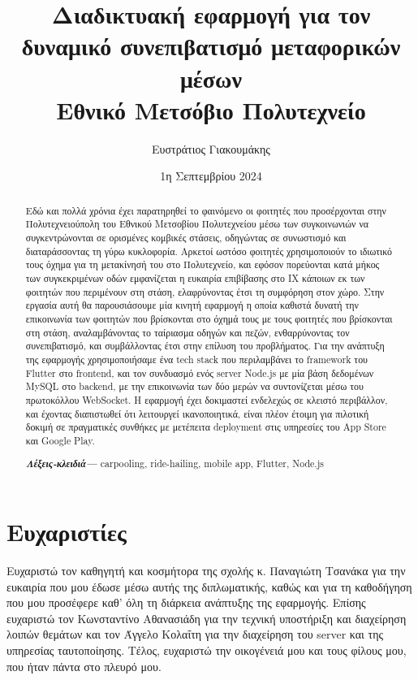 \documentclass[a4paper, 11pt]{report}
\title{
    {Διαδικτυακή εφαρμογή για τον δυναμικό συνεπιβατισμό μεταφορικών μέσων}\\
    {\large Εθνικό Μετσόβιο Πολυτεχνείο}
}
\author{Ευστράτιος Γιακουμάκης}
\date{1η Σεπτεμβρίου 2024}
\begin{document}
\begin{abstract}\thispagestyle{plain}
    Εδώ και πολλά χρόνια έχει παρατηρηθεί το φαινόμενο οι φοιτητές που προσέρχονται στην Πολυτεχνειούπολη του Εθνικού Μετσοβίου Πολυτεχνείου μέσω των συγκοινωνιών να συγκεντρώνονται σε ορισμένες κομβικές στάσεις, οδηγώντας σε συνωστισμό και διαταράσσοντας τη γύρω κυκλοφορία.
    Αρκετοί ωστόσο φοιτητές χρησιμοποιούν το ιδιωτικό τους όχημα για τη μετακίνησή του στο Πολυτεχνείο, και εφόσον πορεύονται κατά μήκος των συγκεκριμένων οδών εμφανίζεται η ευκαιρία επιβίβασης στο ΙΧ κάποιων εκ των φοιτητών που περιμένουν στη στάση, ελαφρύνοντας έτσι τη συμφόρηση στον χώρο.
    Στην εργασία αυτή θα παρουσιάσουμε μία κινητή εφαρμογή η οποία καθιστά δυνατή την επικοινωνία των φοιτητών που βρίσκονται στο όχημά τους με τους φοιτητές που βρίσκονται στη στάση, αναλαμβάνοντας το ταίριασμα οδηγών και πεζών, ενθαρρύνοντας τον συνεπιβατισμό, και συμβάλλοντας έτσι στην επίλυση του προβλήματος.
    Για την ανάπτυξη της εφαρμογής χρησιμοποιήσαμε ένα tech stack που περιλαμβάνει το framework του Flutter στο frontend, και τον συνδυασμό ενός server Node.js με μία βάση δεδομένων MySQL στο backend, με την επικοινωνία των δύο μερών να συντονίζεται μέσω του πρωτοκόλλου WebSocket.
    Η εφαρμογή έχει δοκιμαστεί ενδελεχώς σε κλειστό περιβάλλον, και έχοντας διαπιστωθεί ότι λειτουργεί ικανοποιητικά, είναι πλέον έτοιμη για πιλοτική δοκιμή σε πραγματικές συνθήκες με μετέπειτα deployment στις υπηρεσίες του App Store και Google Play.
    
    \hspace{10pt}

    \small	
    \textbf{\textit{Λέξεις-κλειδιά---}}
    carpooling, ride-hailing, mobile app, Flutter, Node.js
    \afterpage{\blankpage}
\end{abstract}

\section*{Ευχαριστίες}
Ευχαριστώ τον καθηγητή και κοσμήτορα της σχολής κ. Παναγιώτη Τσανάκα για την ευκαιρία που μου έδωσε μέσω αυτής της διπλωματικής, καθώς και για τη καθοδήγηση που μου προσέφερε καθ' όλη τη διάρκεια ανάπτυξης της εφαρμογής. Επίσης ευχαριστώ τον Κωνσταντίνο Αθανασιάδη για την τεχνική υποστήριξη και διαχείρηση λοιπών θεμάτων και τον Άγγελο Κολαΐτη για την διαχείρηση του server και της υπηρεσίας ταυτοποίησης. Τέλος, ευχαριστώ την οικογένειά μου και τους φίλους μου, που ήταν πάντα στο πλευρό μου.

\tableofcontents
\end{document}
